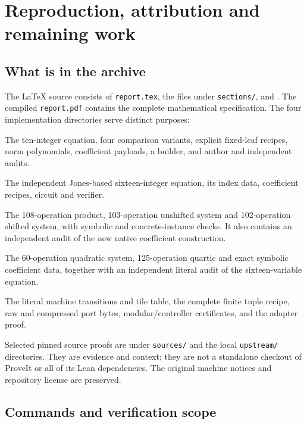 \section{Reproduction, attribution and remaining work}
\label{sec:reproduction}

\subsection{What is in the archive}

The LaTeX source consists of \texttt{report.tex}, the files under
\texttt{sections/}, and .
The compiled \texttt{report.pdf} contains the complete
mathematical specification.  The four implementation directories serve
distinct purposes:
\begin{description}[leftmargin=28mm,style=nextline]
 \item[\texttt{signed10/}] The ten-integer equation, four comparison
 variants, explicit fixed-leaf recipes, norm polynomials, coefficient
 payloads, a builder, and author and independent audits.
 \item[\texttt{signed16/}] The independent Jones-based sixteen-integer
 equation, its index data, coefficient recipes, circuit and verifier.
 \item[\texttt{positive12/}] The 108-operation product, 103-operation
 unshifted system and 102-operation shifted system, with symbolic and
 concrete-instance checks.  It also contains an independent audit of the
 new native coefficient construction.
 \item[\texttt{quartic31/}] The 60-operation quadratic system,
 125-operation quartic and exact symbolic coefficient data, together with
 an independent literal audit of the sixteen-variable equation.
 \item[\texttt{coefficients/}] The literal machine transitions and tile
 table, the complete finite tuple recipe, raw and compressed port bytes,
 modular/controller certificates, and the adapter proof.
\end{description}
Selected pinned source proofs are under \texttt{sources/} and the local
\texttt{upstream/} directories.  They are evidence and context; they are
not a standalone checkout of ProveIt or all of its Lean dependencies.
The original machine notices and repository license are preserved.

\subsection{Commands and verification scope}

